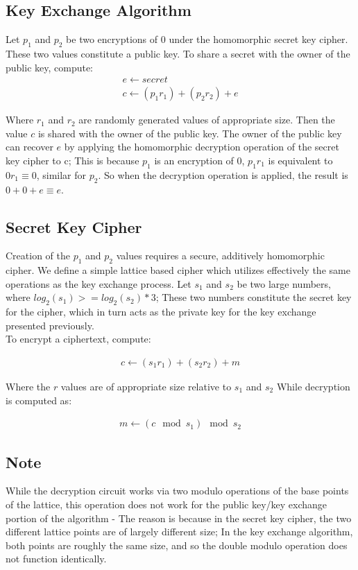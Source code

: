 \documentclass[preprint]{iacrtrans}
\begin{document}
\subsection{Key Exchange Algorithm}
Let $p_1$ and $p_2$ be two encryptions of $0$ under the homomorphic secret key cipher. These two values constitute a public key. To share a secret with the owner of the public key, compute:
\begin{align}
    e \gets secret \\
    c \gets (p_1  r_1) + (p_2 r_2) + e
\end{align}

Where $r_1$ and $r_2$ are randomly generated values of appropriate size. Then the value $c$ is shared with the owner of the public key. The owner of the public key can recover $e$ by applying the homomorphic decryption operation of the secret key cipher to c; This is because $p_1$ is an encryption of $0$, $p_1 r_1$ is equivalent to $0 r_1 \equiv 0$, similar for $p_2$. So when the decryption operation is applied, the result is $0 + 0 + e \equiv e$.

\subsection{Secret Key Cipher}
Creation of the $p_1$ and $p_2$ values requires a secure, additively homomorphic cipher. We define a simple lattice based cipher which utilizes effectively the same operations as the key exchange process. Let $s_1$ and $s_2$ be two large numbers, where $log_2(s_1) >= log_2(s_2) * 3$; These two numbers constitute the secret key for the cipher, which in turn acts as the private key for the key exchange presented previously.\\

To encrypt a ciphertext, compute:

\begin{align}
   c \gets (s_1 r_1) + (s_2 r_2) + m
\end{align}

Where the $r$ values are of appropriate size relative to $s_1$ and $s_2$ 
While decryption is computed as:

\begin{align}
    m \gets (c \mod s_1) \mod s_2
\end{align}

\subsection{Note}
While the decryption circuit works via two modulo operations of the base points of the lattice, this operation does not work for the public key/key exchange portion of the algorithm - The reason is because in the secret key cipher, the two different lattice points are of largely different size; In the key exchange algorithm, both points are roughly the same size, and so the double modulo operation does not function identically.
\end{document}

